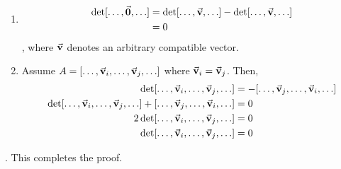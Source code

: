 \documentclass{homework}
\begin{document}
\begin{problem}{3}
\begin{enumerate}
\item 
\begin{align*}
\det[\hdots, \vec{\mathbf{0}}, \hdots]
&= \det[\hdots, \vec{\mathbf{v}}, \hdots] - \det[\hdots, \vec{\mathbf{v}}, \hdots] \\
&= 0
\end{align*}
, where $\vec{\mathbf{v}}$ denotes an arbitrary compatible vector. \QED

\item 
Assume $A = [\hdots, \vec{\mathbf{v}}_i, \hdots, \vec{\mathbf{v}}_j, \hdots]$
where $\vec{\mathbf{v}}_i = \vec{\mathbf{v}}_j$. Then,
\begin{align*}
\det[\hdots, \vec{\mathbf{v}}_i, \hdots, \vec{\mathbf{v}}_j, \hdots]
&=- [\hdots, \vec{\mathbf{v}}_j, \hdots, \vec{\mathbf{v}}_i, \hdots] \\
\det[\hdots, \vec{\mathbf{v}}_i, \hdots, \vec{\mathbf{v}}_j, \hdots]
  + [\hdots, \vec{\mathbf{v}}_j, \hdots, \vec{\mathbf{v}}_i, \hdots]
&= 0 \\
2\det[\hdots, \vec{\mathbf{v}}_i, \hdots, \vec{\mathbf{v}}_j, \hdots]&= 0 \\
\det[\hdots, \vec{\mathbf{v}}_i, \hdots, \vec{\mathbf{v}}_j, \hdots]&= 0
\end{align*}
\end{enumerate}
. This completes the proof. \QED
\end{problem}
\end{document}
